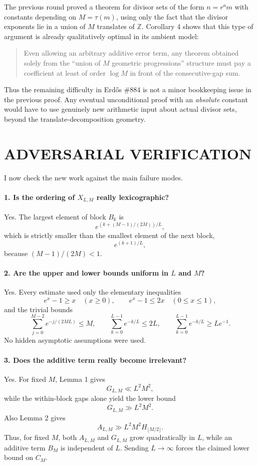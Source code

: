 The previous round proved a theorem for divisor sets of the form \(n=r^a m\) with constants depending on \(M=\tau(m)\), using only the fact that the divisor exponents lie in a union of \(M\) translates of \(\mathbb Z\). Corollary 4 shows that this type of argument is already qualitatively optimal in its ambient model:

\begin{quote}
Even allowing an arbitrary additive error term, any theorem obtained solely from the ``union of \(M\) geometric progressions'' structure must pay a coefficient at least of order \(\log M\) in front of the consecutive-gap sum.
\end{quote}

Thus the remaining difficulty in Erd\H{o}s \#884 is not a minor bookkeeping issue in the previous proof. Any eventual unconditional proof with an \emph{absolute} constant would have to use genuinely new arithmetic input about actual divisor sets, beyond the translate-decomposition geometry.

\section{ADVERSARIAL VERIFICATION}

I now check the new work against the main failure modes.

\paragraph{1. Is the ordering of \(X_{L,M}\) really lexicographic?}
Yes. The largest element of block \(B_k\) is
\[
e^{(k+(M-1)/(2M))/L},
\]
which is strictly smaller than the smallest element of the next block,
\[
e^{(k+1)/L},
\]
because \((M-1)/(2M)<1\).

\paragraph{2. Are the upper and lower bounds uniform in \(L\) and \(M\)?}
Yes. Every estimate used only the elementary inequalities
\[
e^x-1\ge x \quad (x\ge 0),
\qquad
e^x-1\le 2x \quad (0\le x\le 1),
\]
and the trivial bounds
\[
\sum_{j=0}^{M-2}e^{-j/(2ML)}\le M,
\qquad
\sum_{k=0}^{L-1}e^{-k/L}\le 2L,
\qquad
\sum_{k=0}^{L-1}e^{-k/L}\ge Le^{-1}.
\]
No hidden asymptotic assumptions were used.

\paragraph{3. Does the additive term really become irrelevant?}
Yes. For fixed \(M\), Lemma 1 gives
\[
G_{L,M}\ll L^2M^2,
\]
while the within-block gaps alone yield the lower bound
\[
G_{L,M}\gg L^2M^2.
\]
Also Lemma 2 gives
\[
A_{L,M}\gg L^2M^2H_{\lfloor M/2\rfloor}.
\]
Thus, for fixed \(M\), both \(A_{L,M}\) and \(G_{L,M}\) grow quadratically in \(L\), while an additive term \(B_M\) is independent of \(L\). Sending \(L\to\infty\) forces the claimed lower bound on \(C_M\).

